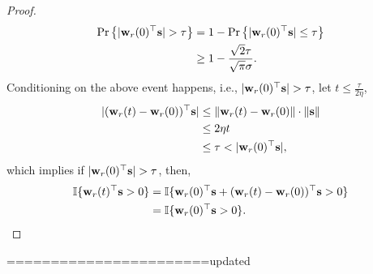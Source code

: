 \begin{proof}
\begin{equation*}
\begin{split}
	\operatorname*{Pr}\left\{ | {\mathbf{w}}_r(0)^\top {\mathbf{s}} | > \tau\right\} &= 1 - \operatorname*{Pr}\left\{ | {\mathbf{w}}_r(0)^\top {\mathbf{s}} | \le \tau\right\} \\
	&\ge 1 - \frac{\sqrt{2}\tau}{\sqrt{\pi}\sigma}.
\end{split}
\end{equation*}
Conditioning on the above event happens, i.e., $| {\mathbf{w}}_r(0)^\top {\mathbf{s}} | > \tau$, let $t \le \frac{\tau}{ 2 \eta }$,
\begin{equation*}
\begin{split}
	| ( {\mathbf{w}}_r(t) - {\mathbf{w}}_r(0) )^\top {\mathbf{s}} | &\le \| {\mathbf{w}}_r(t) - {\mathbf{w}}_r(0) \| \cdot \| {\mathbf{s}} \| \\
	&\le 2 \eta t \\
	&\le \tau < | {\mathbf{w}}_r(0)^\top {\mathbf{s}} |,
\end{split}
\end{equation*}
which implies if $| {\mathbf{w}}_r(0)^\top {\mathbf{s}} | > \tau$, then,
\begin{equation*}
\begin{split}
	{\mathbb{I}}\{ {\mathbf{w}}_r(t)^\top {\mathbf{s}} > 0 \} &= {\mathbb{I}}\{ {\mathbf{w}}_r(0)^\top {\mathbf{s}}  + ( {\mathbf{w}}_r(t) - {\mathbf{w}}_r(0) )^\top {\mathbf{s}} > 0 \} \\
	&= {\mathbb{I}}\{ {\mathbf{w}}_r(0)^\top {\mathbf{s}} > 0 \}. \qedhere
\end{split}
\end{equation*}
\end{proof}

=======================updated

